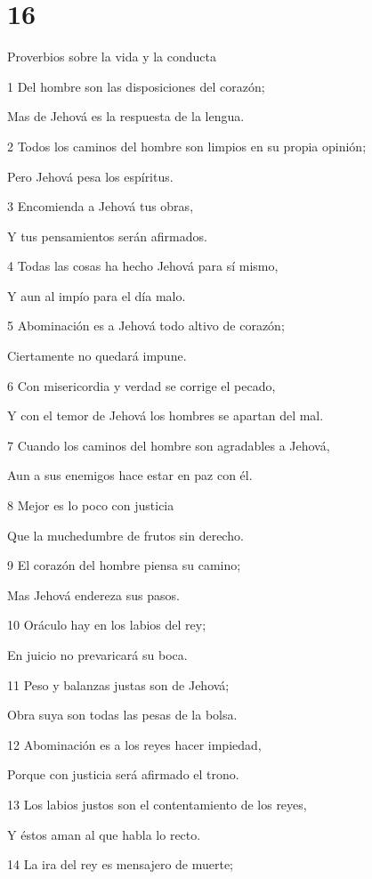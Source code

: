 \chapter{16}

\par Proverbios sobre la vida y la conducta
\par 1 Del hombre son las disposiciones del corazón;
\par Mas de Jehová es la respuesta de la lengua.
\par 2 Todos los caminos del hombre son limpios en su propia opinión;
\par Pero Jehová pesa los espíritus.
\par 3 Encomienda a Jehová tus obras,
\par Y tus pensamientos serán afirmados.
\par 4 Todas las cosas ha hecho Jehová para sí mismo,
\par Y aun al impío para el día malo.
\par 5 Abominación es a Jehová todo altivo de corazón;
\par Ciertamente no quedará impune.
\par 6 Con misericordia y verdad se corrige el pecado,
\par Y con el temor de Jehová los hombres se apartan del mal.
\par 7 Cuando los caminos del hombre son agradables a Jehová,
\par Aun a sus enemigos hace estar en paz con él.
\par 8 Mejor es lo poco con justicia 
\par Que la muchedumbre de frutos sin derecho.
\par 9 El corazón del hombre piensa su camino;
\par Mas Jehová endereza sus pasos.
\par 10 Oráculo hay en los labios del rey;
\par En juicio no prevaricará su boca.
\par 11 Peso y balanzas justas son de Jehová;
\par Obra suya son todas las pesas de la bolsa.
\par 12 Abominación es a los reyes hacer impiedad,
\par Porque con justicia será afirmado el trono.
\par 13 Los labios justos son el contentamiento de los reyes,
\par Y éstos aman al que habla lo recto.
\par 14 La ira del rey es mensajero de muerte;
